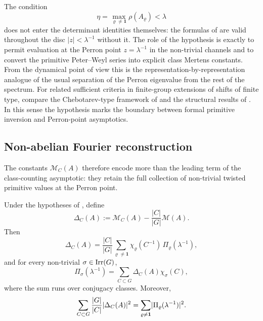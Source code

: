 \begin{remark}
  \label{rem:twisted-spectral-gap-role}
  The condition
  \[
    \eta=\max_{\varrho\neq\mathbf 1}\rho(A_\varrho)<\lambda
  \]
  does not enter the determinant identities themselves: the formulas of
  are valid throughout the disc \(|z|<\lambda^{-1}\) without it. The
  role of the hypothesis is exactly to permit evaluation at the Perron
  point \(z=\lambda^{-1}\) in the non-trivial channels and to convert
  the primitive Peter--Weyl series into explicit class Mertens
  constants. From the dynamical point of view this is the
  representation-by-representation analogue of the usual separation of
  the Perron eigenvalue from the rest of the spectrum. For related
  sufficient criteria in finite-group extensions of shifts of finite
  type, compare the Chebotarev-type framework of
  \cite{ParryPollicott1986Chebotarev} and the structural results of
  \cite{BoyleSchmieding2017FiniteGroupExtensions}. In this sense the
  hypothesis marks the boundary between formal primitive inversion and
  Perron-point asymptotics.
\end{remark}

\subsection{Non-abelian Fourier reconstruction}

The constants \(\mathcal M_C(A)\) therefore encode more than the leading
term of the class-counting asymptotic: they retain the full collection
of non-trivial twisted primitive values at the Perron point.

\begin{theorem}
  \label{thm:class-mertens-fourier}
  Under the hypotheses of , define
  \[
    \Delta_C(A)
    :=\mathcal M_C(A)-\frac{|C|}{|G|}\mathcal M(A).
  \]
  Then
  \begin{equation}\label{eq:class-mertens-fourier-expansion}
    \Delta_C(A)
    =
    \frac{|C|}{|G|}
      \sum_{\varrho\neq\mathbf 1}
        \chi_\varrho(C^{-1})\,\Pi_\varrho(\lambda^{-1}),
  \end{equation}
  and for every non-trivial \(\sigma\in\operatorname{Irr}(G)\),
  \begin{equation}\label{eq:class-mertens-fourier-inversion}
    \Pi_\sigma(\lambda^{-1})
    =
    \sum_{C\subset G}\Delta_C(A)\chi_\sigma(C),
  \end{equation}
  where the sum runs over conjugacy classes. Moreover,
  \begin{equation}\label{eq:class-mertens-plancherel}
    \sum_{C\subset G}\frac{|G|}{|C|}\lvert \Delta_C(A) \rvert^2
    =
    \sum_{\varrho\neq\mathbf 1}
      \lvert \Pi_\varrho(\lambda^{-1}) \rvert^2.
  \end{equation}
\end{theorem}

